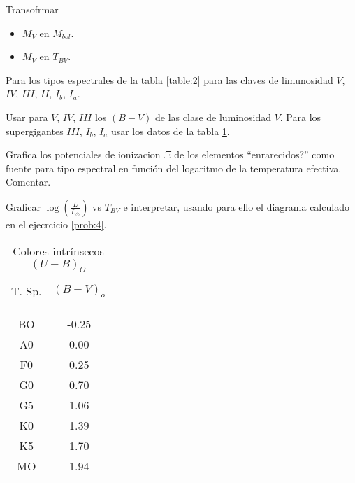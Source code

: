 \documentclass[12pt,a4paper]{practice}
\begin{document}
    \begin{problem}\label{prob:13}
        Transofrmar
            \begin{itemize}
                \item $M_{V}$ en $M_{bol}$.
                \item $M_{V}$ en $T_{BV}$.
            \end{itemize}

            Para los tipos espectrales de la tabla \ref{table:2} para las claves de limunosidad $V$, $IV$, $III$, $II$, $I_{b}$, $I_{a}$.

            Usar para $V$, $IV$, $III$ los $\left(B-V\right)$ de las clase de luminosidad $V$. Para los supergigantes $III$, $I_{b}$, $I_{a}$ usar los datos de la tabla \ref{table:3}.
    \end{problem}

    \begin{problem}\label{prob:14}
        Grafica los potenciales de ionizacion $\Xi$ de los elementos ``enrarecidos?'' como fuente para tipo espectral en función del logaritmo de la temperatura efectiva. Comentar.
    \end{problem}

    \begin{problem}\label{prob:15}
        \begin{ppart}\label{prob:15:B}
            Graficar $\log\left(\frac{L}{L_\odot}\right)$ vs $T_{BV}$ e interpretar, usando para ello el diagrama calculado en el ejecrcicio \ref{prob:4}.
        \end{ppart}

        \begin{table}[h!]
            \centering
            \begin{tabular}{c | c}
                T. Sp.  & $\left(B-V\right)_{o}$ \\\\
                  &  \\[-0.8em]\hline
                  &  \\[-0.8em]
                BO & -0.25 \\
                A0 &  0.00 \\
                F0 &  0.25 \\
                G0 &  0.70 \\
                G5 &  1.06 \\
                K0 &  1.39 \\
                K5 &  1.70 \\
                MO &  1.94 \\
                \hline
            \end{tabular}
            \caption{
                Colores intrínsecos $\left(U-B\right)_O$
            }\label{table:3}
        \end{table}
    \end{problem}
\end{document}
